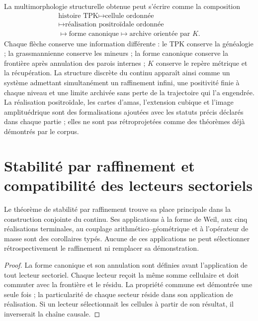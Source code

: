 La multimorphologie structurelle obtenue peut s’écrire comme la composition
\[
 \boxed{
 \begin{gathered}\text{histoire TPK}\longmapsto\text{cellule ordonnée}\\
 \longmapsto\text{réalisation positroïdale ordonnée}\\
 \longmapsto\text{forme canonique}\longmapsto\text{archive orientée par }K.\end{gathered}}
\]
Chaque flèche conserve une information différente : le TPK conserve la généalogie ; la grassmannienne conserve les mineurs ; la forme canonique conserve la frontière après annulation des parois internes ; \(K\) conserve le repère métrique et la récupération. La structure discrète du continu apparaît ainsi comme un système admettant simultanément un raffinement infini, une positivité finie à chaque niveau et une limite archivée sans perte de la trajectoire qui l’a engendrée. La réalisation positroïdale, les cartes d’amas, l’extension cubique et l’image amplituédrique sont des formalisations ajoutées avec les statuts précis déclarés dans chaque partie ; elles ne sont pas rétroprojetées comme des théorèmes déjà démontrés par le corpus.



\section{Stabilité par raffinement et compatibilité des lecteurs sectoriels}

\begin{theorem}
\label{geometria_positiva:thm:unidad-distribucion} Le théorème de stabilité par raffinement trouve sa place principale dans la construction conjointe du continu. Ses applications à la forme de Weil, aux cinq réalisations terminales, au couplage arithmético--géométrique et à l’opérateur de masse sont des corollaires typés. Aucune de ces applications ne peut sélectionner rétrospectivement le raffinement ni remplacer sa démonstration.
\end{theorem}
\begin{proof}
La forme canonique et son annulation sont définies avant l’application de tout lecteur sectoriel. Chaque lecteur reçoit la même somme cellulaire et doit commuter avec la frontière et le résidu. La propriété commune est démontrée une seule fois ; la particularité de chaque secteur réside dans son application de réalisation. Si un lecteur sélectionnait les cellules à partir de son résultat, il inverserait la chaîne causale.
\end{proof}

